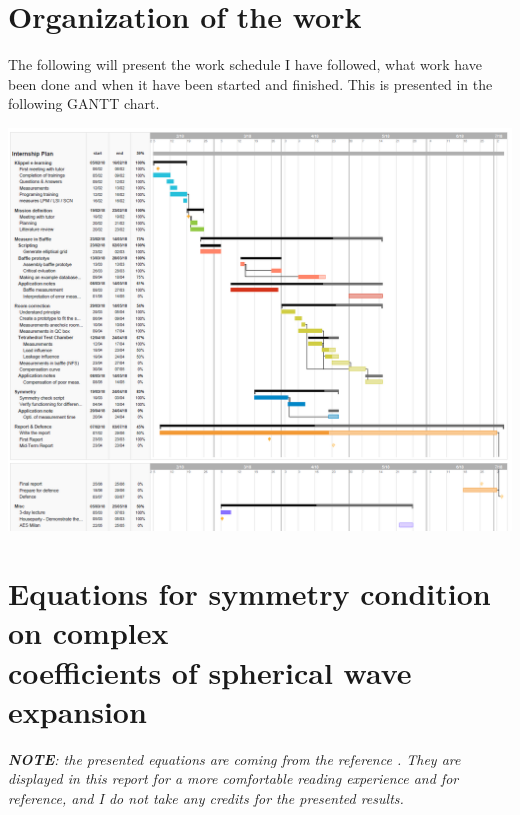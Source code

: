 \documentclass{report}
\begin{document}
\begin{appendices}

\chapter{Organization of the work}

The following will present the work schedule I have followed, what work have been done and when it have been started and finished. This is presented in the following GANTT chart.

\begin{center}
	\includegraphics[width=\textwidth]{Appendix/Plan1} 
\end{center}


\chapter[Equations for symmetry condition on complex coefficients of spherical wave expansion]{Equations for symmetry condition on complex \\ coefficients of spherical wave expansion}
\label{chap:sym}

\textit{\textbf{NOTE}: the presented equations are coming from the reference \cite{aeshs}. They are displayed in this report for a more comfortable reading experience and for reference, and I do not take any credits for the presented results.} \\


\end{appendices}
\end{document}
